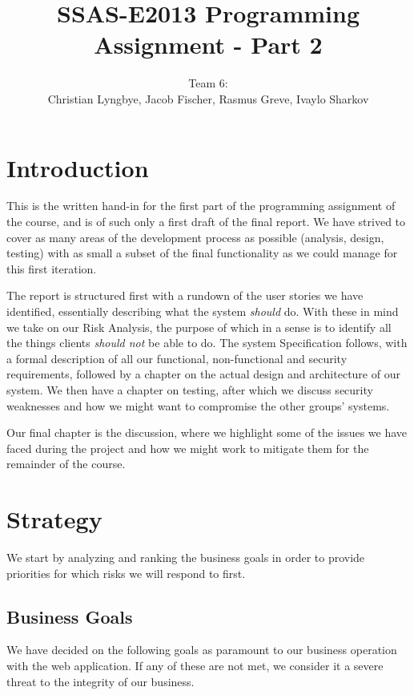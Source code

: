 \documentclass[a4paper]{article}
\title{SSAS-E2013 Programming Assignment - Part 2}
\author{Team 6:\\Christian Lyngbye, Jacob Fischer, Rasmus Greve, Ivaylo Sharkov}
\begin{document}
\maketitle

\section{Introduction}
This is the written hand-in for the first part of the programming assignment of the course, and is of such only a first draft of the final report. We have strived to cover as many areas of the development process as possible (analysis, design, testing) with as small a subset of the final functionality as we could manage for this first iteration.

The report is structured first with a rundown of the user stories we have identified, essentially describing what the system \emph{should} do. With these in mind we take on our Risk Analysis, the purpose of which in a sense is to identify all the things clients \emph{should not} be able to do. The system Specification follows, with a formal description of all our functional, non-functional and security requirements, followed by a chapter on the actual design and architecture of our system. We then have a chapter on testing, after which we discuss security weaknesses and how we might want to compromise the other groups' systems.

Our final chapter is the discussion, where we highlight some of the issues we have faced during the project and how we might work to mitigate them for the remainder of the course.

\section{Strategy}

We start by analyzing and ranking the business goals in order to provide priorities for which risks we will respond to first.
\subsection{Business Goals}
We have decided on the following goals as paramount to our business operation with the web application. If any of these are not met, we consider it a severe threat to the integrity of our business.
\end{document}
